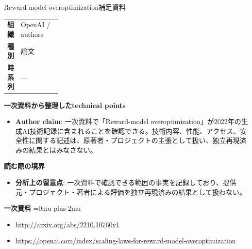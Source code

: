 \begin{technicalnote}{Reward-model overoptimization}{補足資料}
\begingroup
\begin{tabularx}{\linewidth}{@{}>{\bfseries}p{0.22\linewidth}X@{}}
組織 & OpenAI / authors \\
種別 & 論文 \\
時系列 & — \\
\end{tabularx}
\smallskip
{\bfseries 一次資料から整理したtechnical points}
\begin{itemize}[leftmargin=1.5em,itemsep=0.35em]
\item \textbf{Author claim}: 一次資料で「Reward-model overoptimization」が2022年の生成AI技術記録に含まれることを確認できる。技術内容、性能、アクセス、安全性に関する記述は、原著者・プロジェクトの主張として扱い、独立再現済みの結果とはみなさない。
\end{itemize}
\begin{minipage}{\linewidth}
{\bfseries 読む際の境界}
\begin{itemize}[leftmargin=1.5em,itemsep=0.35em]
\item \textbf{分析上の留意点}: 一次資料で確認できる範囲の事実を記録しており、提供元・プロジェクト・著者による評価を独立再現済みの結果として扱わない。
\end{itemize}
\begin{samepage}
{\bfseries 一次資料}
\begingroup\sloppy
\Urlmuskip=0mu plus 2mu\relax
\begin{itemize}[leftmargin=1.5em,itemsep=0.25em]
\item {\scriptsize\url{http://arxiv.org/abs/2210.10760v1}}
\item {\scriptsize\url{https://openai.com/index/scaling-laws-for-reward-model-overoptimization}}
\end{itemize}
\endgroup
\end{samepage}
\end{minipage}
\endgroup
\end{technicalnote}
\medskip
